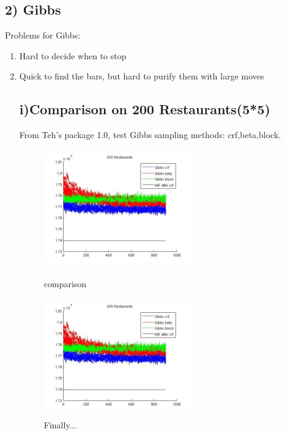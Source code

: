 \documentclass{article}
\begin{document}
\begin{spacing}{1.1}
\section{2) Gibbs}
Problems for Gibbs:\\
\begin{enumerate}
\item Hard to decide when to stop
\item Quick to find the bars, but hard to purify them with large moves

\subsection{i)Comparison on 200 Restaurants(5*5)}
From Teh's package 1.0, test Gibbs sampling methods: crf,beta,block.\\

\begin{figure}[h] 
  \begin{minipage}[b]{0.5\textwidth} 
    \centering 
    \includegraphics[width=2.5in,height=2in]{200compare.jpg} 
    \caption{comparison}
    \label{fig:by:table} 
  \end{minipage}%
  \begin{minipage}[b]{0.5\textwidth} 
    \centering 
    \includegraphics[width=2.5in,height=2in]{200compare.jpg} 
    \caption{Finally...}
    \label{fig:by:table}  
   \end{minipage}%
\end{figure}



\end{enumerate}


\end{spacing}
\end{document}
